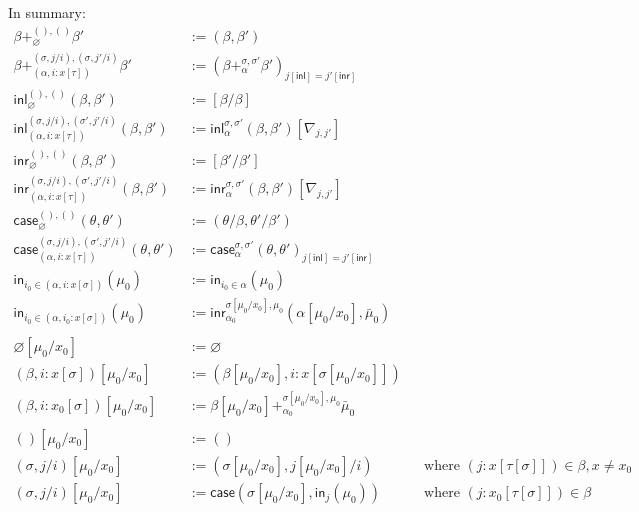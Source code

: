 \documentclass[10pt]{article}
\let\emptyset\varnothing
\newcommand\Pushout[5]{\ensuremath{#1 +^{#4,#5}_{#2} #3}}
\newcommand{\case}{\mathsf{case}}
\newcommand{\inl}{\mathsf{inl}}
\newcommand{\inr}{\mathsf{inr}}
\newcommand{\ini}{\mathsf{in}}
\begin{document}
In summary:
\begin{align*}
\Pushout{\beta}{\emptyset}{\beta'}{()}{()} &:= (\beta, \beta') \\
\Pushout{\beta}{(\alpha, i : x[\tau])}{\beta'}{(\sigma, j/i)}{(\sigma, j'/i)} &:= (\Pushout{\beta}{\alpha}{\beta'}{\sigma}{\sigma'})_{j[\inl] = j'[\inr]} \\
\inl^{(), ()}_\emptyset(\beta, \beta') &:= [\beta/\beta] \\
\inl^{(\sigma, j/i), (\sigma', j'/i)}_{(\alpha, i:x[\tau])} (\beta, \beta') &:= \inl^{\sigma, \sigma'}_\alpha (\beta, \beta') [\nabla_{j, j'}] \\
\inr^{(), ()}_\emptyset(\beta, \beta') &:= [\beta'/\beta'] \\
\inr^{(\sigma, j/i), (\sigma', j'/i)}_{(\alpha, i:x[\tau])} (\beta, \beta') &:= \inr^{\sigma, \sigma'}_\alpha (\beta, \beta') [\nabla_{j, j'}] \\
\case^{(),()}_\emptyset(\theta, \theta') &:= (\theta / \beta, \theta' / \beta') \\
\case^{(\sigma,j/i),(\sigma', j'/i)}_{(\alpha,i:x[\tau])}(\theta, \theta') &:= \case^{\sigma, \sigma'}_{\alpha}(\theta, \theta')_{j[\inl]=j'[\inr]} \\
\ini_{i_0 \in (\alpha, i : x[\sigma])}(\mu_0) &:= \ini_{i_0 \in \alpha}(\mu_0)\\
\ini_{i_0 \in (\alpha, i_0 : x[\sigma])}(\mu_0) &:= \inr^{\sigma[\mu_0/x_0],\mu_0}_{\alpha_0}(\alpha[\mu_0/x_0], \bar \mu_0) \\
\\
\emptyset[\mu_0/x_0] &:= \emptyset \\
(\beta, i : x[\sigma])[\mu_0/x_0] &:= (\beta[\mu_0/x_0], i : x[\sigma[\mu_0/x_0]]) \\
(\beta, i : x_0[\sigma])[\mu_0/x_0] &:= \Pushout{\beta[\mu_0/x_0]}{\alpha_0}{\bar \mu_0}{\sigma[\mu_0/x_0]}{\mu_0} \\
\\
()[\mu_0/x_0] &:= () \\
(\sigma, j/i)[\mu_0/x_0] &:= (\sigma[\mu_0/x_0], j[\mu_0/x_0]/i) && \text{where } (j : x[\tau[\sigma]]) \in \beta, x \neq x_0 \\
(\sigma, j/i)[\mu_0/x_0] &:= \case(\sigma[\mu_0/x_0], \ini_j(\mu_0)) && \text{where } (j : x_0[\tau[\sigma]]) \in \beta \\
\\
\end{align*}
\end{document}

